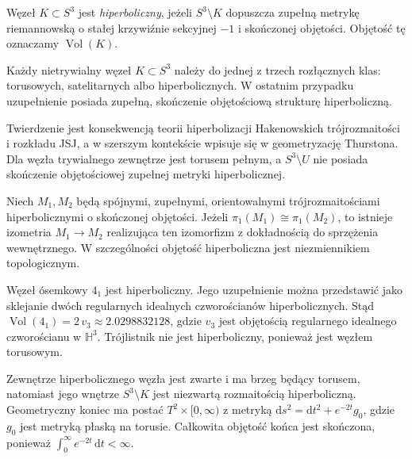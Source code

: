 \begin{definicja}
Węzeł $K\subset S^3$ jest \emph{hiperboliczny}, jeżeli
$S^3\setminus K$ dopuszcza zupełną metrykę riemannowską
o stałej krzywiźnie sekcyjnej $-1$ i skończonej objętości.
Objętość tę oznaczamy $\operatorname{Vol}(K)$.
\end{definicja}

\begin{twierdzenie}
Każdy nietrywialny węzeł $K\subset S^3$ należy do jednej
z trzech rozłącznych klas: torusowych, satelitarnych albo
hiperbolicznych. W ostatnim przypadku uzupełnienie posiada
zupełną, skończenie objętościową strukturę hiperboliczną.
\end{twierdzenie}

\begin{uwaga}
Twierdzenie jest konsekwencją teorii hiperbolizacji
Hakenowskich trójrozmaitości i rozkładu JSJ, a w szerszym
kontekście wpisuje się w geometryzację Thurstona.
Dla węzła trywialnego zewnętrze jest torusem pełnym,
a $S^3\setminus U$ nie posiada skończenie objętościowej
zupełnej metryki hiperbolicznej.
\end{uwaga}

\begin{twierdzenie}
Niech $M_1,M_2$ będą spójnymi, zupełnymi, orientowalnymi
trójrozmaitościami hiperbolicznymi o skończonej objętości.
Jeżeli $\pi_1(M_1)\cong\pi_1(M_2)$, to istnieje izometria
$M_1\to M_2$ realizująca ten izomorfizm z dokładnością
do sprzężenia wewnętrznego. W szczególności objętość
hiperboliczna jest niezmiennikiem topologicznym.
\end{twierdzenie}

\begin{przyklad}
Węzeł ósemkowy $4_1$ jest hiperboliczny. Jego uzupełnienie
można przedstawić jako sklejanie dwóch regularnych idealnych
czworościanów hiperbolicznych. Stąd
$\operatorname{Vol}(4_1)=2\,v_3\approx2.0298832128$,
gdzie $v_3$ jest objętością regularnego idealnego
czworościanu w $\mathbb H^3$. Trójlistnik nie jest
hiperboliczny, ponieważ jest węzłem torusowym.
\end{przyklad}

\begin{uwaga}
Zewnętrze hiperbolicznego węzła jest zwarte i ma brzeg
będący torusem, natomiast jego wnętrze $S^3\setminus K$
jest niezwartą rozmaitością hiperboliczną. Geometryczny
koniec ma postać $T^2\times[0,\infty)$ z metryką
$\mathrm ds^2=\mathrm dt^2+e^{-2t}g_0$,
gdzie $g_0$ jest metryką płaską na torusie.
Całkowita objętość końca jest skończona, ponieważ
$\int_0^\infty e^{-2t}\,\mathrm dt<\infty$.
\end{uwaga}

